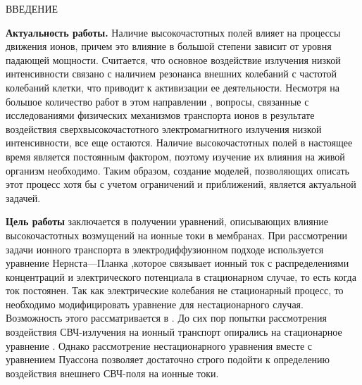 \begin{center}
    ВВЕДЕНИЕ
\end{center}
\vspace*{1cm}

\textbf{Актуальность работы.} Наличие высокочастотных полей влияет на процессы
    движения ионов, причем это влияние в большой степени зависит от уровня
    падающей мощности. Считается, что основное воздействие излучения низкой
    интенсивности связано с наличием резонанса внешних колебаний с частотой
    колебаний клетки, что приводит к активизации ее деятельности. Несмотря
    на большое количество работ в этом направлении
    \cite{bib:1,bib:2,bib:3,bib:4,bib:5,bib:6,bib:7,bib:19}, вопросы, связанные
    с исследованиями физических механизмов транспорта ионов в результате
    воздействия сверхвысокочастотного электромагнитного излучения низкой
    интенсивности, все еще остаются. Наличие высокочастотных полей в
    настоящее время является постоянным фактором, поэтому изучение их
    влияния на живой организм необходимо. Таким образом, создание моделей,
    позволяющих описать этот процесс хотя бы с учетом ограничений и
    приближений, является актуальной задачей.

\textbf{Цель работы} заключается в получении уравнений, описывающих влияние
    высокочастотных возмущений на ионные токи в мембранах. При рассмотрении
    задачи ионного транспорта в электродиффузионном подходе используется
    уравнение Нернста—Планка \cite{bib:8,bib:9,bib:10,bib:11,bib:12,bib:13,
    bib:14,bib:15,bib:16,bib:17,bib:18},которое связывает ионный ток с
    распределениями концентраций и электрического потенциала в стационарном
    случае, то есть когда ток постоянен. Так как электрические колебания не
    стационарный процесс, то необходимо модифицировать уравнение для
    нестационарного случая. Возможность этого рассматривается в \cite{bib:8}.
    До сих пор попытки рассмотрения воздействия СВЧ-излучения на ионный
    транспорт опирались на стационарное уравнение \cite{bib:1,bib:3,bib:19}.
    Однако рассмотрение нестационарного уравнения вместе с уравнением Пуассона
    позволяет достаточно строго подойти к определению воздействия внешнего
    СВЧ-поля на ионные токи.
